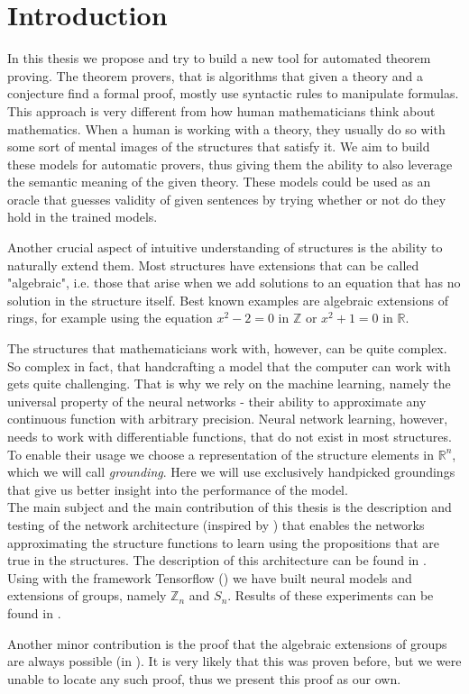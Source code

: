 \chapter*{Introduction}
\label{intro}

In this thesis we propose and try to build a new tool for automated theorem proving. The theorem provers, that is algorithms that given a theory and a conjecture find a formal proof, mostly use syntactic rules to manipulate formulas. This approach is very different from how human mathematicians think about mathematics. When a human is working with a theory, they usually do so with some sort of mental images of the structures that satisfy it. We aim to build these models for automatic provers, thus giving them the ability to also leverage the semantic meaning of the given theory. These models could be used as an oracle that guesses validity of given sentences by trying whether or not do they hold in the trained models.

Another crucial aspect of intuitive understanding of structures is the ability to naturally extend them. Most structures have extensions that can be called "algebraic", i.e. those that arise when we add solutions to an equation that has no solution in the structure itself. Best known examples are algebraic extensions of rings, for example using the equation $x^2-2=0$ in $\mathbb{Z}$ or $x^2+1=0$ in $\mathbb{R}$.

The structures that mathematicians work with, however, can be quite complex. So complex in fact, that handcrafting a model that the computer can work with gets quite challenging. That is why we rely on the machine learning, namely the universal property of the neural networks - their ability to approximate any continuous function with arbitrary precision. Neural network learning, however, needs to work with differentiable functions, that do not exist in most structures. To enable their usage we choose a representation of the structure elements in $\mathbb{R}^n$, which we will call \textit{grounding}. Here we will use exclusively handpicked groundings that give us better insight into the performance of the model.\\

The main subject and the main contribution of this thesis is the description and testing of the network architecture (inspired by \cite{serafini}) that enables the networks approximating the structure functions to learn using the propositions that are true in the structures. The description of this architecture can be found in . Using with the framework Tensorflow (\cite{tf}) we have built neural models and extensions of groups, namely $\mathbb{Z}_n$ and $S_n$. Results of these experiments can be found in .

Another minor contribution is the proof that the algebraic extensions of groups are always possible (in ). It is very likely that this was proven before, but we were unable to locate any such proof, thus we present this proof as our own.